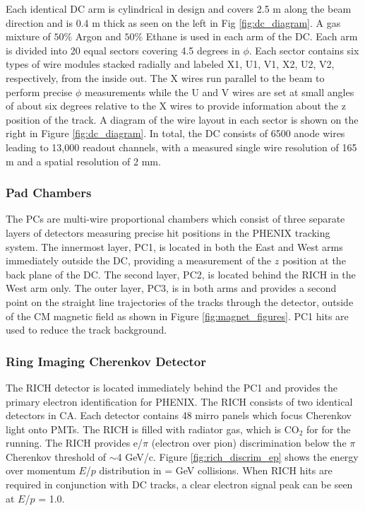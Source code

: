 Each identical DC arm is cylindrical in design and covers 2.5 m along the beam direction and is 0.4 m thick as seen on the left in Fig \ref{fig:dc_diagram}. A gas mixture of $50\%$ Argon and $50\%$ Ethane is used in each arm of the DC. Each arm is divided into 20 equal sectors covering 4.5 degrees in $\phi$. Each sector contains six types of wire modules stacked radially and labeled X1, U1, V1, X2, U2, V2, respectively, from the inside out. The X wires run parallel to the beam to perform precise $\phi$ measurements while the U and V wires are set at small angles of about six degrees relative to the X wires to provide information about the z position of the track. A diagram of the wire layout in each sector is shown on the right in Figure \ref{fig:dc_diagram}. In total, the DC consists of 6500 anode wires leading to 13,000 readout channels, with a measured single wire resolution of 165 m and a spatial resolution of  2 mm.

\subsubsection{Pad Chambers}
The PCs are multi-wire proportional chambers which consist of three separate layers of detectors measuring precise hit positions in the PHENIX tracking system. The innermost layer, PC1, is located in both the East and West arms immediately outside the DC, providing a measurement of the $z$ position at the back plane of the DC. The second layer, PC2, is located behind the RICH in the West arm only. The outer layer, PC3, is in both arms and provides a second point on the straight line trajectories of the tracks through the detector, outside of the CM magnetic field as shown in Figure \ref{fig:magnet_figures}. PC1 hits are used to reduce the track background.

\subsubsection{Ring Imaging Cherenkov Detector}
The RICH detector is located immediately behind the PC1 and provides the primary electron identification for PHENIX. The RICH consists of two identical detectors in CA. Each detector contains 48 mirro panels which focus Cherenkov light onto PMTs. The RICH is filled with radiator gas, which is CO$_2$ for for the \pau running. The RICH provides e/$\pi$ (electron over pion) discrimination below the $\pi$ Cherenkov threshold of $\sim$4 GeV/c. Figure \ref{fig:rich_discrim_ep} shows the energy over momentum $E$/$p$ distribution in \auau =  GeV collisions. When RICH hits are required in conjunction with DC tracks, a clear electron signal peak can be seen at $E$/$p$ = 1.0.

